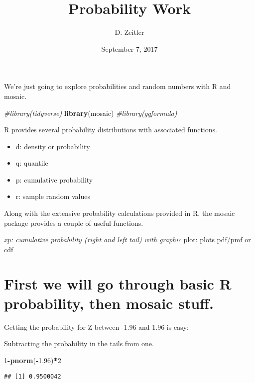 \documentclass[]{article}
\title{Probability Work}
\author{D. Zeitler}
\date{September 7, 2017}
\newenvironment{Shaded}{\begin{snugshade}}{\end{snugshade}}
\newcommand{\KeywordTok}[1]{\textcolor[rgb]{0.13,0.29,0.53}{\textbf{#1}}}
\newcommand{\DecValTok}[1]{\textcolor[rgb]{0.00,0.00,0.81}{#1}}
\newcommand{\FloatTok}[1]{\textcolor[rgb]{0.00,0.00,0.81}{#1}}
\newcommand{\CommentTok}[1]{\textcolor[rgb]{0.56,0.35,0.01}{\textit{#1}}}
\newcommand{\OperatorTok}[1]{\textcolor[rgb]{0.81,0.36,0.00}{\textbf{#1}}}
\newcommand{\NormalTok}[1]{#1}
\providecommand{\tightlist}{%
  \setlength{\itemsep}{0pt}\setlength{\parskip}{0pt}}
\begin{document}
\maketitle

We're just going to explore probabilities and random numbers with R and
mosaic.

\begin{Shaded}
\begin{Highlighting}[]
\CommentTok{#library(tidyverse)}
\KeywordTok{library}\NormalTok{(mosaic)}
\CommentTok{#library(ggformula)}
\end{Highlighting}
\end{Shaded}

R provides several probability distributions with associated functions.

\begin{itemize}
\tightlist
\item
  d: density or probability
\item
  q: quantile
\item
  p: cumulative probability
\item
  r: sample random values
\end{itemize}

Along with the extensive probability calculations provided in R, the
mosaic package provides a couple of useful functions.

\emph{xp: cumulative probability (right and left tail) with graphic
}plot: plots pdf/pmf or cdf

\section{First we will go through basic R probability, then mosaic
stuff.}\label{first-we-will-go-through-basic-r-probability-then-mosaic-stuff.}

Getting the probability for Z between -1.96 and 1.96 is easy:

Subtracting the probability in the tails from one.

\begin{Shaded}
\begin{Highlighting}[]
\DecValTok{1}\OperatorTok{-}\KeywordTok{pnorm}\NormalTok{(}\OperatorTok{-}\FloatTok{1.96}\NormalTok{)}\OperatorTok{*}\DecValTok{2}
\end{Highlighting}
\end{Shaded}

\begin{verbatim}
## [1] 0.9500042
\end{verbatim}
\end{document}

